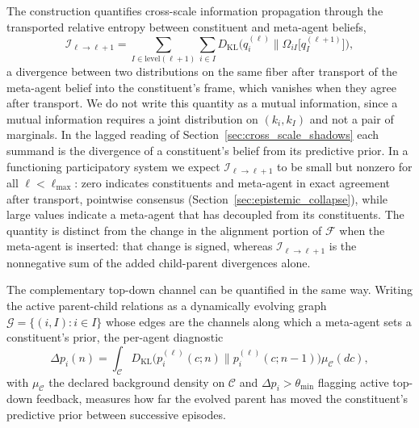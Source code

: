 The construction quantifies cross-scale information propagation through the transported relative entropy between constituent and meta-agent beliefs,
\begin{equation}
\mathcal{I}_{\ell \to \ell+1} = \sum_{I \in \mathrm{level}(\ell+1)} \sum_{i \in I} D_{\mathrm{KL}}\big(q_i^{(\ell)} \big\| \Omega_{iI}\big[q_I^{(\ell+1)}\big]\big),
\label{eq:cross_scale_information_flow}
\end{equation}
a divergence between two distributions on the same fiber after transport of the meta-agent belief into the constituent's frame, which vanishes when they agree after transport. We do not write this quantity as a mutual information, since a mutual information requires a joint distribution on $(k_i, k_I)$ and not a pair of marginals. In the lagged reading of Section~\ref{sec:cross_scale_shadows} each summand is the divergence of a constituent's belief from its predictive prior. In a functioning participatory system we expect $\mathcal{I}_{\ell \to \ell+1}$ to be small but nonzero for all $\ell < \ell_{\max}$: zero indicates constituents and meta-agent in exact agreement after transport, pointwise consensus (Section~\ref{sec:epistemic_collapse}), while large values indicate a meta-agent that has decoupled from its constituents. The quantity is distinct from the change in the alignment portion of $\mathcal{F}$ when the meta-agent is inserted: that change is signed, whereas $\mathcal{I}_{\ell \to \ell+1}$ is the nonnegative sum of the added child-parent divergences alone.

The complementary top-down channel can be quantified in the same way. Writing the active parent-child relations as a dynamically evolving graph $\mathcal{G} = \{(i, I) : i \in I\}$ whose edges are the channels along which a meta-agent sets a constituent's prior, the per-agent diagnostic
\begin{equation}
\Delta p_i(n) = \int_{\mathcal{C}} D_{\mathrm{KL}}\big(p_i^{(\ell)}(c; n) \big\| p_i^{(\ell)}(c; n-1)\big) \mu_{\mathcal{C}}(dc),
\label{eq:topdown_influence}
\end{equation}
with $\mu_{\mathcal{C}}$ the declared background density on $\mathcal{C}$ and $\Delta p_i > \theta_{\min}$ flagging active top-down feedback, measures how far the evolved parent has moved the constituent's predictive prior between successive episodes.

